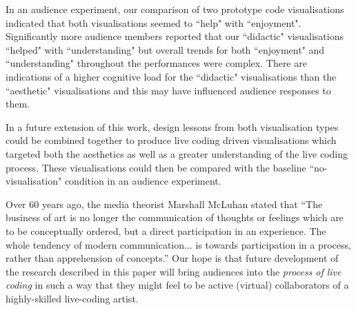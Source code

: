 \documentclass{sig-alternate}
\begin{document}
In an audience experiment, our comparison of two prototype code visualisations indicated that both visualisations seemed to ``help" with ``enjoyment". Significantly more audience members reported that our ``didactic" visualisations ``helped" with ``understanding" but overall trends for both ``enjoyment" and ``understanding" throughout the performances were complex. There are indications of a higher cognitive load for the ``didactic" visualisations than the ``aesthetic" visualisations and this may have influenced audience responses to them. 

In a future extension of this work, design lessons from both visualisation types could be combined together to produce live coding driven visualisations which targeted both the aesthetics as well as a greater understanding of the live coding process. These visualisations could then be compared with the baseline ``no-visualisation" condition in an audience experiment. 

Over 60 years ago, the media theorist Marshall McLuhan stated that ``The business of art is no longer the communication of thoughts or feelings which are to be conceptually ordered, but a direct participation in an experience. The whole tendency of modern communication... is towards participation in a process, rather than apprehension of concepts.'' \cite{McLuhan} Our hope is that future development of the research described in this paper will bring audiences into the \textit{process of live coding} in such a way that they might feel to be active (virtual) collaborators of a highly-skilled live-coding artist.


\end{document}
